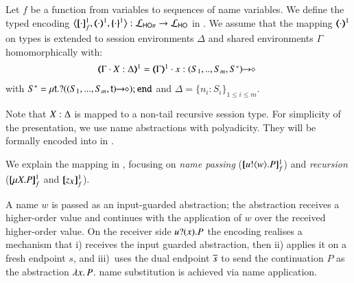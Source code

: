 \begin{definition}
\label{d:enc:hopitoho}
Let $f$ be a function from variables to sequences of name variables.
%
We define the typed encoding 
$\enco{\map{\cdot}^{1}_f, \mapt{\cdot}^{1}, \mapa{\cdot}^{1}}: \tyl{L}_{\HOp} \to \tyl{L}_{\HO}$ in 
. 
We assume that the mapping $(\!\!\langle\cdot\rangle\!\!)^{1}$ on types is extended to 
session environments $\Delta$
and
shared environments $\Gamma$ homomorphically with: 
\[
	\begin{array}{l}
		\tmap{\Gamma \cat \varp{X}:\Delta}{1}  =  \tmap{\Gamma}{1} \cat x:\shot{(S_1,..,S_m,S^*)} \ 
	\end{array}
\]
with
$S^* = \mu\mathsf{t}.? ((S_1,...,S_m,\mathsf{t})\!\! \rightarrow\!\! \diamond) ; \mathtt{end}$
and $\Delta = \{n_i:S_i\}_{1\leq i\leq m}$. 
\end{definition}

\smallskip 
\noi Note that $X:\Delta$ is mapped to a non-tail
recursive session type.
For simplicity of the presentation, %
we use name abstractions with polyadicity.
They will be formally encoded into \HO in .

We explain the mapping in , focusing 
on {\em name passing} ($[\!\![u ! \langle w \rangle . P]\!\!]^1_f$) and  
{\em recursion} ($[\!\![\mu X. P]\!\!]^1_f$ and $[\!\![z_X]\!\!]^1_f$). 

A name $w$ is   passed as an input-guarded abstraction;
the abstraction receives a higher-order
value and continues with the application of $w$ over
the received higher-order value.
On the receiver side $u ? (x) . P$ 
the encoding realises a mechanism that i) receives
the input guarded abstraction, then ii) applies it on a fresh  endpoint $s$, 
and iii)~uses
the dual endpoint $\overline{s}$ to send the continuation $P$ as the abstraction
$\lambda x.\,P$. 
 name substitution is achieved via name application.

